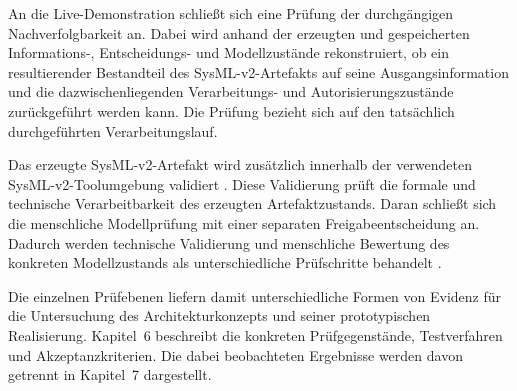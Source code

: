 An die Live-Demonstration schließt sich eine Prüfung der durchgängigen
Nachverfolgbarkeit an. Dabei wird anhand der erzeugten und gespeicherten
Informations-, Entscheidungs- und Modellzustände rekonstruiert, ob ein
resultierender Bestandteil des SysML-v2-Artefakts auf seine
Ausgangsinformation und die dazwischenliegenden Verarbeitungs- und
Autorisierungszustände zurückgeführt werden kann. Die Prüfung bezieht sich auf
den tatsächlich durchgeführten Verarbeitungslauf.

Das erzeugte SysML-v2-Artefakt wird zusätzlich innerhalb der verwendeten
SysML-v2-Toolumgebung validiert \cite{SysMLv2,Cibrian.2025b}. Diese
Validierung prüft die formale und technische Verarbeitbarkeit des erzeugten
Artefaktzustands. Daran schließt sich die menschliche Modellprüfung mit einer
separaten Freigabeentscheidung an. Dadurch werden technische Validierung und
menschliche Bewertung des konkreten Modellzustands als unterschiedliche
Prüfschritte behandelt \cite{Topcu2025}.

Die einzelnen Prüfebenen liefern damit unterschiedliche Formen von Evidenz
für die Untersuchung des Architekturkonzepts und seiner prototypischen
Realisierung. Kapitel~6 beschreibt die konkreten Prüfgegenstände,
Testverfahren und Akzeptanzkriterien. Die dabei beobachteten Ergebnisse
werden davon getrennt in Kapitel~7 dargestellt.
